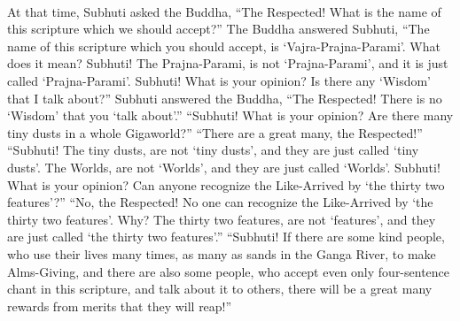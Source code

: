 \documentclass[a5paper,12pt]{book}
\begin{document}
    ~

     At that time, Subhuti asked the Buddha, ``The Respected! What is the name of this scripture which we should accept?'' The Buddha answered Subhuti, ``The name of this scripture which you should accept, is `Vajra-Prajna-Parami'. What does it mean? Subhuti! The Prajna-Parami, is not `Prajna-Parami', and it is just called `Prajna-Parami'. Subhuti! What is your opinion? Is there any `Wisdom' that I talk about?'' Subhuti answered the Buddha, ``The Respected! There is no `Wisdom' that you `talk about'.'' ``Subhuti! What is your opinion? Are there many tiny dusts in a whole Gigaworld?'' ``There are a great many, the Respected!'' ``Subhuti! The tiny dusts, are not `tiny dusts', and they are just called `tiny dusts'. The Worlds, are not `Worlds', and they are just called `Worlds'. Subhuti! What is your opinion? Can anyone recognize the Like-Arrived by `the thirty two features'?'' ``No, the Respected! No one can recognize the Like-Arrived by `the thirty two features'. Why? The thirty two features, are not `features', and they are just called `the thirty two features'.'' ``Subhuti! If there are some kind people, who use their lives many times, as many as sands in the Ganga River, to make Alms-Giving, and there are also some people, who accept even only four-sentence chant in this scripture, and talk about it to others, there will be a great many rewards from merits that they will reap!''

    ~
\end{document}
